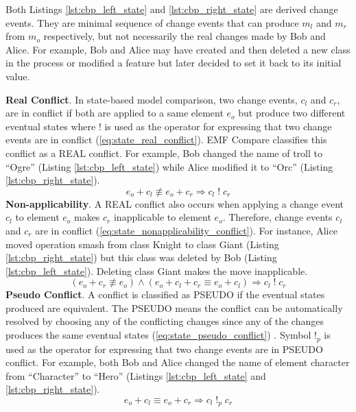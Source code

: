 Both Listings \ref{lst:cbp_left_state} and \ref{lst:cbp_right_state} are derived change events. They are minimal sequence of change events that can produce $m_{l}$ and $m_{r}$ from $m_{o}$ respectively, but not necessarily the real changes made by Bob and Alice. For example, Bob and Alice may have created and then deleted a new class in the process or modified a feature but later decided to set it back to its initial value.

\textbf{Real Conflict}. In state-based model comparison, two change events, $c_{l}$ and $c_{r}$, are in conflict if both are applied to a same element $e_{o}$ but produce two different eventual states where $!$ is used as the operator for expressing that two change events are in conflict (\ref{eq:state_real_conflict}). EMF Compare \cite{emfcompare2018developer} classifies this conflict as a \textsf{REAL} conflict. For example, Bob changed the \textsf{name} of \textsf{troll} to ``Ogre'' (Listing \ref{lst:cbp_left_state}) while Alice modified it to ``Orc'' (Listing \ref{lst:cbp_right_state}). 
\begin{equation} \label{eq:state_real_conflict}
e_{o} + c_{l} \not\equiv e_{o} + c_{r} \Rightarrow c_{l}\;!\;c_{r}
\end{equation} 
\textbf{Non-applicability}. A \textsf{REAL} conflict also occurs when applying a change event $c_{l}$ to element $e_{o}$ makes $c_{r}$ inapplicable to element $e_{o}$. Therefore, change events $c_{l}$ and $c_{r}$ are in conflict (\ref{eq:state_nonapplicability_conflict}). 
For instance, Alice moved operation \textsf{smash} from class \textsf{Knight} to class \textsf{Giant} (Listing \ref{lst:cbp_right_state}) but this class was deleted by Bob (Listing \ref{lst:cbp_left_state}). Deleting class \textsf{Giant} makes the move inapplicable. 
\begin{equation} \label{eq:state_nonapplicability_conflict}
(e_{o} + c_{r} \not\equiv e_{o}) \wedge (e_{o} + c_{l} + c_{r} \equiv e_{o} + c_{l}) \Rightarrow c_{l}\;!\;c_{r}
\end{equation}
\textbf{Pseudo Conflict}. A conflict is classified as \textsf{PSEUDO} if the eventual states produced are equivalent. The \textsf{PSEUDO} means the conflict can be automatically resolved by choosing any of the conflicting changes since any of the changes produces the same eventual states (\ref{eq:state_pseudo_conflict}) \cite{emfcompare2018developer}. Symbol $!_{p}$ is used as the operator for expressing that two change events are in \textsf{PSEUDO} conflict. For example, both Bob and Alice changed the \textsf{name} of element \textsf{character} from ``Character'' to ``Hero'' (Listings \ref{lst:cbp_left_state} and \ref{lst:cbp_right_state}). 
\begin{equation} \label{eq:state_pseudo_conflict}
e_{o} + c_{l} \equiv e_{o} + c_{r} \Rightarrow c_{l}\;!_{p}\;c_{r}
\end{equation} 


